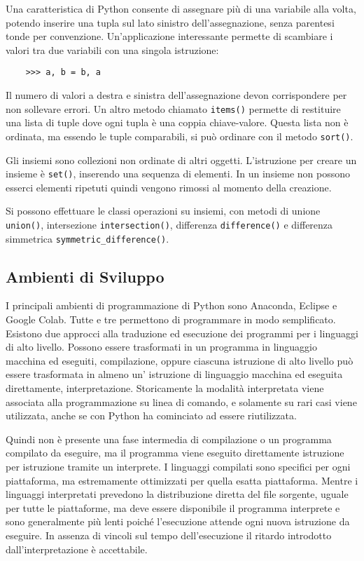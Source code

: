 \documentclass{article}
\numberwithin{equation}{subsection}
\begin{document}
Una caratteristica di Python consente di assegnare più di una variabile alla volta, potendo inserire una 
tupla sul lato sinistro dell'assegnazione, senza parentesi tonde per convenzione. 
Un'applicazione interessante permette di scambiare i valori tra due variabili con una singola istruzione:
\begin{verbatim}
    >>> a, b = b, a
\end{verbatim}

Il numero di valori a destra e sinistra dell'assegnazione devon corrispondere per non sollevare errori. 
Un altro metodo chiamato \verb|items()| permette di restituire una lista di tuple dove ogni tupla è una coppia 
chiave-valore. Questa lista non è ordinata, ma essendo le tuple comparabili, si può ordinare con il metodo \verb|sort()|. 


Gli insiemi sono collezioni non ordinate di altri oggetti. L'istruzione per creare un insieme è \verb|set()|, inserendo 
una sequenza di elementi. In un insieme non possono esserci elementi ripetuti quindi vengono rimossi 
al momento della creazione. 

Si possono effettuare le classi operazioni su insiemi, con metodi di unione \verb|union()|, 
intersezione \verb|intersection()|, differenza \verb|difference()| e differenza simmetrica \verb|symmetric_difference()|. 

\subsection{Ambienti di Sviluppo}

I principali ambienti di programmazione di Python sono Anaconda, Eclipse e Google Colab. Tutte e 
tre permettono di programmare in modo semplificato. 
Esistono due approcci alla traduzione ed esecuzione dei programmi per i linguaggi di alto 
livello. Possono essere trasformati in un programma in linguaggio macchina ed eseguiti, 
compilazione, oppure ciascuna istruzione di alto livello può essere trasformata in almeno un'
istruzione di linguaggio macchina ed eseguita direttamente, interpretazione. 
Storicamente la modalità interpretata viene associata alla programmazione su linea di comando, 
e solamente su rari casi viene utilizzata, anche se con Python ha cominciato ad essere riutilizzata. 

Quindi non è presente una fase intermedia di compilazione o un programma compilato da 
eseguire, ma il programma viene eseguito direttamente istruzione per istruzione tramite un 
interprete. 
I linguaggi compilati sono specifici per ogni piattaforma, ma estremamente ottimizzati 
per quella esatta piattaforma. Mentre i linguaggi interpretati prevedono la 
distribuzione diretta del file sorgente, uguale per tutte le piattaforme, ma deve essere 
disponibile il programma interprete e sono generalmente più lenti poiché l'esecuzione attende 
ogni nuova istruzione da eseguire. 
In assenza di vincoli sul tempo dell'esecuzione il ritardo introdotto dall'interpretazione 
è accettabile. 
\end{document}
